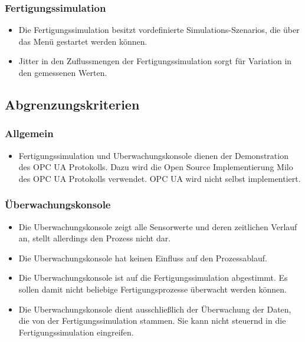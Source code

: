 \documentclass[parskip=full]{scrartcl}
\begin{document}
\subsubsection{Fertigungssimulation}
\begin{itemize}
  \item Die Fertigungssimulation besitzt vordefinierte \glspl{Simulations-Szenario}, die über das Menü gestartet werden können.
  \item \gls{Jitter} in den Zuflussmengen der \gls{Fertigungssimulation} sorgt f\"ur Variation in den gemessenen Werten.
\end{itemize}


\subsection{Abgrenzungskriterien}
\subsubsection{Allgemein}
\begin{itemize}
  \item \gls{Fertigungssimulation} und \gls{Uberwachungskonsole} dienen der Demonstration des \gls{OPC UA} Protokolls. Dazu wird die Open Source
    Implementierung \gls{Milo} des \gls{OPC UA} Protokolls verwendet. \gls{OPC UA} wird nicht selbst implementiert.
\end{itemize}

\subsubsection{Überwachungskonsole}
\begin{itemize}
  \item Die \gls{Uberwachungskonsole} zeigt alle Sensorwerte und deren zeitlichen Verlauf an, stellt allerdings den Prozess nicht dar.
  \item Die \gls{Uberwachungskonsole} hat keinen Einfluss auf den Prozessablauf.
  \item Die \gls{Uberwachungskonsole} ist auf die \gls{Fertigungssimulation} abgestimmt. Es sollen damit nicht beliebige
    Fertigungsprozesse \"uberwacht werden k\"onnen.
  \item Die \gls{Uberwachungskonsole} dient ausschlie{\ss}lich der \"Uberwachung der Daten, die von der \gls{Fertigungssimulation}
    stammen. Sie kann nicht steuernd in die \gls{Fertigungssimulation} eingreifen.
\end{itemize}
\end{document}
